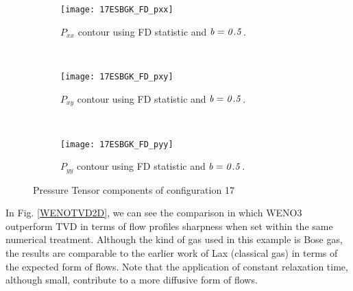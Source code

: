 \documentclass{rsproca}%
\begin{document}
\begin{figure}
        \centering
        \begin{subfigure}[b]{0.32\textwidth}
                \centering
                \texttt{[image: 17ESBGK\_FD\_pxx]}
                \caption{$P_{xx}$ contour using FD statistic and $\it{b=0.5}$.}
                \label{fig:17ESBGK_FD_pxx}
        \end{subfigure}%
        ~ %
        \begin{subfigure}[b]{0.32\textwidth}
                \centering
                \texttt{[image: 17ESBGK\_FD\_pxy]}
                \caption{$P_{xy}$ contour using FD statistic and $\it{b=0.5}$.}
                \label{fig:17ESBGK_FD_pxy}
        \end{subfigure}
        ~ %
        \begin{subfigure}[b]{0.32\textwidth}
                \centering
                \texttt{[image: 17ESBGK\_FD\_pyy]}
                \caption{$P_{yy}$ contour using FD statistic and $\it{b=0.5}$.}
                \label{fig:17ESBGK_FD_pyy}
        \end{subfigure}
        \caption{Pressure Tensor components of configuration 17}\label{fig:conf5_pTensor}
\end{figure}


In Fig. \ref{WENOTVD2D}, we can see the comparison in which WENO3 outperform TVD in terms of flow profiles sharpness when set within the same numerical treatment. Although the kind of gas used in this example is Bose gas, the results are comparable to the earlier work of Lax \cite{Laxliu95} (classical gas) in terms of the expected form of flows. Note that the application of constant relaxation time, although small, contribute to a more diffusive form of flows.
\end{document}
